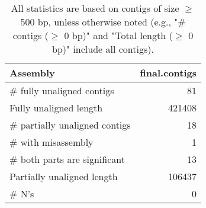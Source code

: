 \documentclass[12pt,a4paper]{article}
\begin{document}
\begin{table}[ht]
\begin{center}
\caption{All statistics are based on contigs of size $\geq$ 500 bp, unless otherwise noted (e.g., "\# contigs ($\geq$ 0 bp)" and "Total length ($\geq$ 0 bp)" include all contigs).}
\begin{tabular}{|l*{1}{|r}|}
\hline
Assembly & final.contigs \\ \hline
\# fully unaligned contigs & 81 \\ \hline
Fully unaligned length & 421408 \\ \hline
\# partially unaligned contigs & 18 \\ \hline
\hspace{5mm}\# with misassembly & 1 \\ \hline
\hspace{5mm}\# both parts are significant & 13 \\ \hline
Partially unaligned length & 106437 \\ \hline
\# N's & 0 \\ \hline
\end{tabular}
\end{center}
\end{table}
\end{document}
